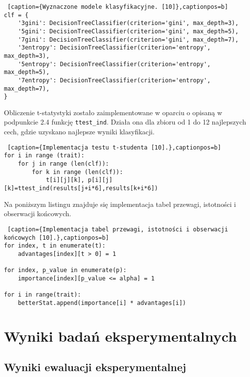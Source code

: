 \documentclass{article}
\begin{document}
\begin{lstlisting} [caption={Wyznaczone modele klasyfikacyjne. [10]},captionpos=b]
clf = {
	'3gini': DecisionTreeClassifier(criterion='gini', max_depth=3),
	'5gini': DecisionTreeClassifier(criterion='gini', max_depth=5),
	'7gini': DecisionTreeClassifier(criterion='gini', max_depth=7),
	'3entropy': DecisionTreeClassifier(criterion='entropy', max_depth=3),
	'5entropy': DecisionTreeClassifier(criterion='entropy', max_depth=5),
	'7entropy': DecisionTreeClassifier(criterion='entropy', max_depth=7),
}

\end{lstlisting}

Obliczenie t-statystyki zostało zaimplementowane w oparciu o opisaną w podpunkcie 2.4 funkcję \texttt{ttest\_ind}. Działa ona dla zbioru od 1 do 12 najlepszych cech, gdzie uzyskano najlepsze wyniki klasyfikacji.\\

\begin{lstlisting} [caption={Implementacja testu t-studenta [10].},captionpos=b]
for i in range (trait):
	for j in range (len(clf)):
		for k in range (len(clf)):
			t[i][j][k], p[i][j][k]=ttest_ind(results[j+i*6],results[k+i*6])

\end{lstlisting}

\newpage

Na poniższym listingu znajduje się implementacja tabel przewagi, istotności i obserwacji końcowych.\\

\begin{lstlisting} [caption={Implementacja tabel przewagi, istotności i obserwacji końcowych [10].},captionpos=b]
for index, t in enumerate(t):
	advantages[index][t > 0] = 1

for index, p_value in enumerate(p):
	importance[index][p_value <= alpha] = 1

for i in range(trait):
	betterStat.append(importance[i] * advantages[i])

\end{lstlisting}

\newpage

\section{Wyniki badań eksperymentalnych}
\subsection{Wyniki ewaluacji eksperymentalnej}
\end{document}
